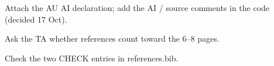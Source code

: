 \begin{notes}
  \item Attach the AU AI declaration; add the AI / source comments in the code (decided 17 Oct).
  \item Ask the TA whether references count toward the 6--8 pages.
  \item Check the two CHECK entries in references.bib.
\end{notes}





